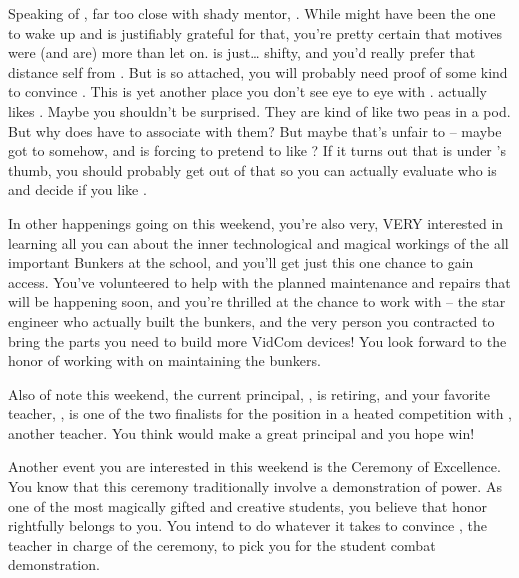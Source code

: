 \documentclass[char]{GL2020}
\begin{document}
Speaking of \cDisney{}, \cDisney{\theyare} far too close with \cDisney{\their} shady mentor, \cWildCard{}. While \cWildCard{} might have been the one to wake \cDisney{} up and \cDisney{\they} is justifiably grateful for that, you're pretty certain that \cWildCard{\their} motives were (and are) more than \cWildcard{\they} let\cWildCard{\plural} on. \cWildCard{} is just\ldots{} shifty, and you'd really prefer that \cDisney{} distance \cDisney{\them}self from \cWildCard{\them}. But \cDisney{} is so attached, you will probably need proof of some kind to convince \cDisney{\them}. This is yet another place you don't see eye to eye with \cPirateChild{}. \cPirateChild{} actually likes \cWildCard{}. Maybe you shouldn't be surprised. They are kind of like two peas in a pod. But why does \cDisney{} have to associate with them? But maybe that's unfair to \cPirateChild{} – maybe \cWildCard{} got to \cPirateChild{\them} somehow, and is forcing \cPirateChild{\them} to pretend to like \cWildCard{\them}? If it turns out that \cPirateChild{} is under \cWildCard{}'s thumb, you should probably get \cPirateChild{\them} out of that so you can actually evaluate who \cPirateChild{\they} is and decide if you like \cPirateChild{\them}.

In other happenings going on this weekend, you're also very, VERY interested in learning all you can about the inner technological and magical workings of the all important Bunkers at the school, and you'll get just this one chance to gain access. You've volunteered to help with the planned maintenance and repairs that will be happening soon, and you're thrilled at the chance to work with \cBunker{} – the star engineer who actually built the bunkers, and the very person you contracted to bring the parts you need to build more VidCom devices! You look forward to the honor of working with \cBunker{} on maintaining the bunkers.

Also of note this weekend, the current principal, \cPrincipal{\full}, is retiring, and your favorite teacher, \cBeetle{\full}, is one of the two finalists for the position in a heated competition with \cMusic{\full}, another teacher. You think \cBeetle{} would make a great principal and you hope \cBeetle{\they} win\cBeetle{\plural}!

Another event you are interested in this weekend is the Ceremony of Excellence. You know that this ceremony traditionally involve a demonstration of power. As one of the most magically gifted and creative students, you believe that honor rightfully belongs to you. You intend to do whatever it takes to convince \cMusic{}, the teacher in charge of the ceremony, to pick you for the student combat demonstration.
\end{document}
